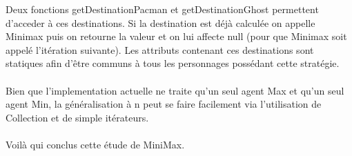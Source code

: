 Deux fonctions getDestinationPacman et getDestinationGhost permettent d'acceder à ces destinations. Si la destination est déjà calculée on appelle Minimax puis on retourne la valeur et on lui affecte null (pour que Minimax soit appelé l'itération suivante).
Les attributs contenant ces destinations sont statiques afin d'être communs à tous les personnages possédant cette stratégie.\\\\

Bien que l'implementation actuelle ne traite qu'un seul agent Max et qu'un seul agent Min, la généralisation à n peut se faire facilement via l'utilisation de Collection et de simple itérateurs.\\\\

Voilà qui conclus cette étude de MiniMax.